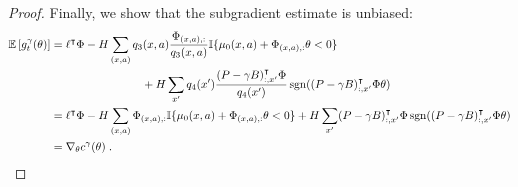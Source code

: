 \documentclass[11pt]{article}
\begin{document}
\begin{proof}
Finally, we show that the subgradient estimate is unbiased:
\begin{align*}
\operatorname*{\mathbb E}\left[g_t^\gamma(\theta)\right] &= \ell^\intercal \Phi - H \sum_{(x,a)} q_3(x,a) \frac{\Phi_{(x,a),:}}{q_3(x,a)} {\mathbb I}{\{\mu_0(x,a)+\Phi_{(x,a),:} \theta < 0\}} \\
&\qquad\qquad\qquad\qquad+ H \sum_{x'} q_4(x') \frac{(P-\gamma B)_{:,x'}^\intercal \Phi}{q_4(x')} \operatorname*{sgn}((P-\gamma B)_{:,x'}^\intercal \Phi \theta) \\
&= \ell^\intercal \Phi - H \sum_{(x,a)} \Phi_{(x,a),:} {\mathbb I}{\{\mu_0(x,a)+\Phi_{(x,a),:} \theta < 0\}}+ H \sum_{x'}  (P-\gamma B)_{:,x'}^\intercal \Phi \operatorname*{sgn}((P-\gamma B)_{:,x'}^\intercal \Phi \theta) \\
&= \nabla_{\theta} c^\gamma(\theta) \; .
\end{align*}
\end{proof}
\end{document}
